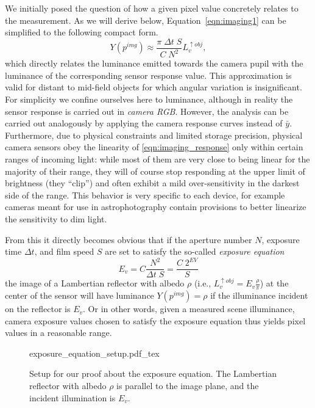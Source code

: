 We initially posed the question of how a given pixel value concretely
relates to the measurement. As we will derive below,
Equation~\eqref{eqn:imaging1} can be simplified to the following
compact form.
\begin{equation}\label{eqn:imaging_response}
  Y(p^{img}) \approx \frac{ \pi\;\Delta t\;S}{C\; N^2} L_v^{\uparrow obj},
\end{equation}
which directly relates the luminance emitted towards the camera pupil
with the luminance of the corresponding sensor response value. This approximation
is valid for distant to mid-field objects for which angular variation
is insignificant. For simplicity we confine ourselves here to luminance, although in
reality the sensor response is carried out in \textit{camera RGB}. However, the
analysis can be carried out analogously by applying the camera
response curves instead of $\bar y$. Furthermore, due to physical
constraints and limited storage precision, physical camera sensors
obey the linearity of \eqref{eqn:imaging_response} only within certain
ranges of incoming light: while most of them are very close to being linear for the
majority of their range, they will of course stop responding at the upper limit of 
brightness (they ``clip'') and often exhibit a mild over-sensitivity in the darkest 
side of the range. This behavior is very specific to each device, 
for example cameras meant for use in astrophotography contain provisions 
to better linearize the sensitivity to dim light.

From this it directly becomes obvious that if the aperture number $N$,
\gls{exposure time} $\Delta t$, and \gls{film speed} $S$ are set to satisfy the
so-called \emph{exposure equation}
\begin{equation}\label{eqn:imaging_Ev}
E_v = C \frac{N^2}{\Delta t\; S} = \frac{C\; 2^{EV}}S
\end{equation}
the image of a Lambertian reflector with albedo $\rho$ (i.e.,
$L_v^{\uparrow obj} = E_v \frac \rho \pi$) at the center of the sensor
will have luminance $Y(p^{img}) = \rho$ if the illuminance incident on
the reflector is $E_v$. Or in other words, given a measured scene
illuminance, camera exposure values chosen to satisfy the exposure
equation thus yields pixel values in a reasonable range.

\begin{figure}[t]
    \centering
    \def\svgwidth{0.9\linewidth}
    {exposure_equation_setup.pdf_tex}
    \caption{\label{fig:exposure_equation_setup}%
        Setup for our proof about the exposure equation. The Lambertian reflector with albedo $\rho$ is parallel to 
        the image plane, and the incident illumination is $E_v$. }
\end{figure}

